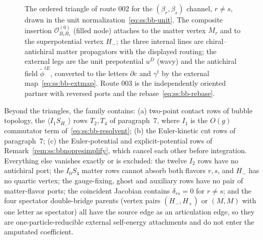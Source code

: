 \begin{figure}[t]
\centering
{}
\caption{The ordered triangle of route 002 for the $(\beta_r,\beta_s)$
channel, $r\ne s$, drawn in the unit normalization~\eqref{eq:ss:bb-unit}. The
composite insertion $\mathcal O_{B_rB_s}^{(0)}$ (filled node) attaches to the
matter vertex $M_r$ and to the superpotential vertex $H_-$; the three internal
lines are chiral--antichiral matter propagators with the displayed routing;
the external legs are the unit prepotential $u^D$ (wavy) and the antichiral
field $\widetilde\phi^{tE}$, converted to the letters $\partial c$ and
$\gamma^t$ by the external map~\eqref{eq:ss:bb-extmap}. Route 003 is the
independently oriented partner with reversed ports and the
rebase~\eqref{eq:ss:bb-rebase}.}
\label{fig:ss:bbtriangle}
\end{figure}

Beyond the triangles, the family contains: (a) two-point contact rows of
bubble topology, the $\langle I_1S_{H_-}\rangle$ rows $T_2,T_4$ of paragraph~7,
where $I_1$ is the $O(g)$ commutator term of~\eqref{eq:ss:bb-resolvent};
(b) the Euler-kinetic cut rows of paragraph~7; (c) the Euler-potential and
explicit-potential rows of Remark~\ref{rem:ss:bbnopresimplify}, which cancel
each other before integration. Everything else vanishes exactly or is
excluded: the twelve $I_2$ rows have no antichiral port; the $I_0S_4$ matter
rows cannot absorb both flavors $r,s$, and $H_-$ has no quartic vertex; the
gauge-fixing, ghost and auxiliary rows have no pair of matter-flavor ports;
the coincident Jacobian contains $\delta_{rs}=0$ for $r\ne s$; and the four
spectator double-bridge parents (vertex pairs $(H_-,H_+)$ or $(M,M)$ with one
letter as spectator) all have the source edge as an articulation edge, so they
are one-particle-reducible external self-energy attachments and do not enter
the amputated coefficient.

